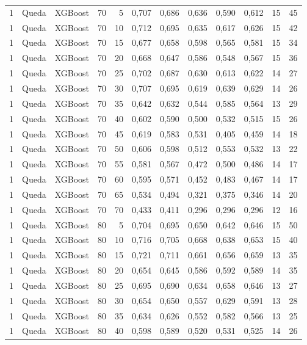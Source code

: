 \begin{longtable}{@{}rllrrrrrrrrr@{}}
1 & Queda & XGBoost & 70 & 5 & 0,707 & 0,686 & 0,636 & 0,590 & 0,612 & 15 & 45 \\
1 & Queda & XGBoost & 70 & 10 & 0,712 & 0,695 & 0,635 & 0,617 & 0,626 & 15 & 42 \\
1 & Queda & XGBoost & 70 & 15 & 0,677 & 0,658 & 0,598 & 0,565 & 0,581 & 15 & 34 \\
1 & Queda & XGBoost & 70 & 20 & 0,668 & 0,647 & 0,586 & 0,548 & 0,567 & 15 & 36 \\
1 & Queda & XGBoost & 70 & 25 & 0,702 & 0,687 & 0,630 & 0,613 & 0,622 & 14 & 27 \\
1 & Queda & XGBoost & 70 & 30 & 0,707 & 0,695 & 0,619 & 0,639 & 0,629 & 14 & 26 \\
1 & Queda & XGBoost & 70 & 35 & 0,642 & 0,632 & 0,544 & 0,585 & 0,564 & 13 & 29 \\
1 & Queda & XGBoost & 70 & 40 & 0,602 & 0,590 & 0,500 & 0,532 & 0,515 & 15 & 26 \\
1 & Queda & XGBoost & 70 & 45 & 0,619 & 0,583 & 0,531 & 0,405 & 0,459 & 14 & 18 \\
1 & Queda & XGBoost & 70 & 50 & 0,606 & 0,598 & 0,512 & 0,553 & 0,532 & 13 & 22 \\
1 & Queda & XGBoost & 70 & 55 & 0,581 & 0,567 & 0,472 & 0,500 & 0,486 & 14 & 17 \\
1 & Queda & XGBoost & 70 & 60 & 0,595 & 0,571 & 0,452 & 0,483 & 0,467 & 14 & 17 \\
1 & Queda & XGBoost & 70 & 65 & 0,534 & 0,494 & 0,321 & 0,375 & 0,346 & 14 & 20 \\
1 & Queda & XGBoost & 70 & 70 & 0,433 & 0,411 & 0,296 & 0,296 & 0,296 & 12 & 16 \\
1 & Queda & XGBoost & 80 & 5 & 0,704 & 0,695 & 0,650 & 0,642 & 0,646 & 15 & 50 \\
1 & Queda & XGBoost & 80 & 10 & 0,716 & 0,705 & 0,668 & 0,638 & 0,653 & 15 & 40 \\
1 & Queda & XGBoost & 80 & 15 & 0,721 & 0,711 & 0,661 & 0,656 & 0,659 & 13 & 35 \\
1 & Queda & XGBoost & 80 & 20 & 0,654 & 0,645 & 0,586 & 0,592 & 0,589 & 14 & 35 \\
1 & Queda & XGBoost & 80 & 25 & 0,695 & 0,690 & 0,634 & 0,658 & 0,646 & 13 & 27 \\
1 & Queda & XGBoost & 80 & 30 & 0,654 & 0,650 & 0,557 & 0,629 & 0,591 & 13 & 28 \\
1 & Queda & XGBoost & 80 & 35 & 0,634 & 0,626 & 0,552 & 0,582 & 0,566 & 13 & 25 \\
1 & Queda & XGBoost & 80 & 40 & 0,598 & 0,589 & 0,520 & 0,531 & 0,525 & 14 & 26 \\

\end{longtable}
